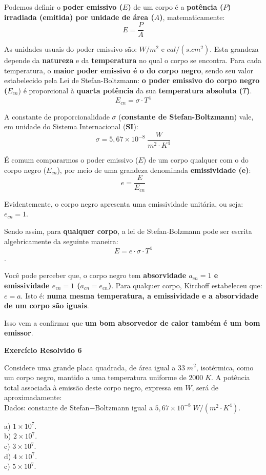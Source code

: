\documentclass[12pt,twoside]{article}
\begin{document}
Podemos definir o \textbf{poder emissivo ($E$)} de um corpo é a \textbf{potência ($P$) irradiada (emitida) por unidade de área ($A$)}, matematicamente: \[E=\dfrac{P}{A}\]


As unidades usuais do poder emissivo são: \textbf{$W/m^{2}$} e \textbf{$cal/(s.cm^{2})$}. Esta grandeza depende da \textbf{natureza} e da \textbf{temperatura} no qual o corpo se encontra. Para cada temperatura, o \textbf{maior poder emissivo é o do corpo negro}, sendo seu valor estabelecido pela Lei de Stefan-Boltzmann: \textbf{o poder emissivo do corpo negro ($E_{cn}$}) é proporcional à \textbf{quarta potência} da sua \textbf{temperatura absoluta ($T$)}. \[E_{cn}=\sigma \cdot T^{4}\]


A constante de proporcionalidade $\sigma$ (\textbf{constante de Stefan-Boltzmann}) vale, em unidade do Sistema Internacional (\textbf{SI}): \[\sigma=5,67\times 10^{-8}\; \dfrac{W}{m^{2}\cdot K^{4}}\]


É comum compararmos o poder emissivo (\textbf{$E$}) de um corpo qualquer com o do corpo negro (\textbf{$E_{cn}$}), por meio de uma grandeza denominada \textbf{emissividade (e)}: \[e=\dfrac{E}{E_{cn}}\]


Evidentemente, o corpo negro apresenta uma emissividade unitária, ou seja: \textbf{$e_{cn}=1$}.


Sendo assim, para \textbf{qualquer corpo}, a lei de Stefan-Bolzmann pode ser escrita algebricamente da seguinte maneira: \[E=e\cdot \sigma \cdot T^{4}\].


Você pode perceber que, o corpo negro tem \textbf{absorvidade $a_{cn}=1$ e emissividade $e_{cn}=1$ ($a_{cn}=e_{cn}$)}. Para qualquer corpo, Kirchoff estabeleceu que: \textbf{$e=a$}. Isto é: \textbf{numa mesma temperatura, a emissividade e a absorvidade de um corpo são iguais}.


Isso vem a confirmar que \textbf{um bom absorvedor de calor também é um bom emissor}.


\textbf{Exercício Resolvido 6}


Considere uma grande placa quadrada, de área igual a $33\;m^{2}$, isotérmica, como um corpo negro, mantido a uma temperatura uniforme de $2000\;K$. A potência total associada à emissão deste corpo negro, expressa em $W$, será de aproximadamente: \\
Dados: constante de Stefan−Boltzmann igual a $5,67\times 10^{-8}\;W/(m^{2}\cdot K^{4})$.


a) $1\times 10^{7}$. \\
b) $2\times 10^{7}$. \\
c) $3\times 10^{7}$. \\
d) $4\times 10^{7}$. \\
c) $5\times 10^{7}$.
\end{document}
